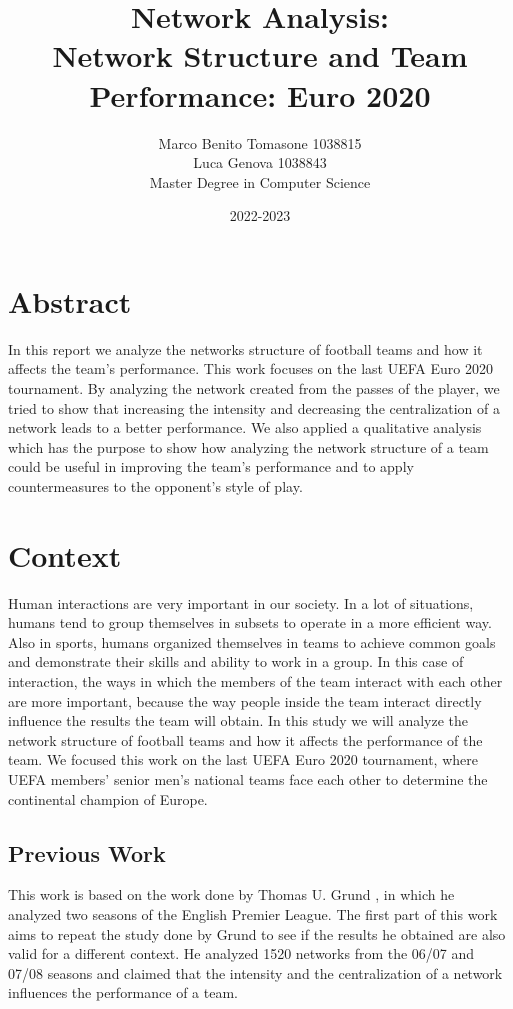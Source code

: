 \documentclass[12pt, a4paper]{article}
\author{Marco Benito Tomasone 1038815 \\ 
        Luca Genova  1038843\\
 Master Degree in Computer Science\\}
\date{2022-2023}
\title{Network Analysis:\\ Network Structure and Team Performance: Euro 2020}
\begin{document}
\maketitle

\section{Abstract}
\label{abstract}
In this report we analyze the networks structure of football teams and how it affects the team's performance. This work focuses on the last UEFA Euro 2020 tournament. By analyzing the network created from the passes of the player, we tried to show that increasing the intensity and decreasing the centralization of a network leads to a better performance. We also applied a qualitative analysis which has the purpose to show how analyzing the network structure of a team could be useful in improving the team's performance and to apply countermeasures to the opponent's style of play.\\

\section{Context}
\label{context}
Human interactions are very important in our society. In a lot of situations, humans tend to group themselves in subsets to operate in a more efficient way. Also in sports, humans organized themselves in teams to achieve common goals and demonstrate their skills and ability to work in a group. In this case of interaction, the ways in which the members of the team interact with each other are more important, because the way people inside the team interact directly influence the results the team will obtain. In this study we will analyze the network structure of football teams and how it affects the performance of the team. We focused this work on the last UEFA Euro 2020 tournament, where UEFA members' senior men's national teams face each other to determine the continental champion of Europe. 
\subsection{Previous Work}
This work is based on the work done by Thomas U. Grund \cite{GRUND}, in which he analyzed two seasons of the English Premier League. 
The first part of this work aims to repeat the study done by Grund to see if the results he obtained are also valid for a different context. He analyzed 1520 networks from the 06/07 and 07/08 seasons and claimed that the intensity and the centralization of a network influences the performance of a team.\\ 
\end{document}
